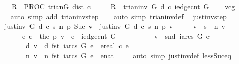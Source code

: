 \begin{isabellebody}
\ \ \ \ {\isasymacute}R\ {\isacharcolon}{\isacharequal}{\isacharequal}\ PROC\ trian{\isacharparenleft}{\isasymacute}G{\isacharcomma}\ {\isasymacute}dist{\isacharcomma}\ {\isasymacute}c{\isacharparenright}\isanewline
\ \ \ \ {\isasymlbrace}\ {\isasymacute}R\ {\isacharequal}\ trian{\isacharunderscore}inv\ G\ d\ c\ {\isacharparenleft}iedge{\isacharunderscore}cnt\ G{\isacharparenright}{\isasymrbrace}{\isachardoublequoteclose}\isanewline
%
\isadelimproof
\ \ %
\endisadelimproof
%
\isatagproof
{}\isamarkupfalse%
\ vcg\ \ \ \isanewline
\ \ \isamarkupfalse%
\ {\isacharparenleft}auto\ simp\ add{\isacharcolon}\ trian{\isacharunderscore}inv{\isacharunderscore}step{\isacharparenright}\isanewline
\ \ \isamarkupfalse%
\ {\isacharparenleft}auto\ simp{\isacharcolon}\ trian{\isacharunderscore}inv{\isacharunderscore}def{\isacharparenright}\ \isanewline
{}\isamarkupfalse%
%
\endisatagproof
{\isafoldproof}%
%
\isadelimproof
\isanewline
%
\endisadelimproof
\isanewline
{}\isamarkupfalse%
\ just{\isacharunderscore}inv{\isacharunderscore}step{\isacharcolon}\isanewline
\ \ {\isachardoublequoteopen}just{\isacharunderscore}inv\ G\ d\ c\ s\ n\ p\ {\isacharparenleft}Suc\ v{\isacharparenright}\ {\isasymlongleftrightarrow}\ just{\isacharunderscore}inv\ G\ d\ c\ s\ n\ p\ v\isanewline
\ \ \ \ {\isasymand}\ {\isacharparenleft}v\ {\isasymnoteq}\ s\ {\isasymand}\ n\ v\ {\isasymnoteq}\ {\isasyminfinity}\ {\isasymlongrightarrow}\ \isanewline
\ \ \ \ \ \ {\isacharparenleft}{\isasymexists}\ e{\isachardot}\ e\ {\isacharequal}\ the\ {\isacharparenleft}p\ v{\isacharparenright}\ {\isasymand}\ e\ {\isacharless}\ iedge{\isacharunderscore}cnt\ G\ {\isasymand}\ \isanewline
\ \ \ \ \ \ \ \ v\ {\isacharequal}\ snd\ {\isacharparenleft}iarcs\ G\ e{\isacharparenright}\ {\isasymand}\isanewline
\ \ \ \ \ \ \ \ d\ v\ {\isacharequal}\ d\ {\isacharparenleft}fst\ {\isacharparenleft}iarcs\ G\ e{\isacharparenright}{\isacharparenright}\ {\isacharplus}\ ereal\ {\isacharparenleft}c\ e{\isacharparenright}\ {\isasymand}\isanewline
\ \ \ \ \ \ \ \ n\ v\ {\isacharequal}\ n\ {\isacharparenleft}fst\ {\isacharparenleft}iarcs\ G\ e{\isacharparenright}{\isacharparenright}\ {\isacharplus}\ {\isacharparenleft}enat\ {}{\isacharparenright}{\isacharparenright}{\isacharparenright}{\isachardoublequoteclose}\isanewline
%
\isadelimproof
\ \ %
\endisadelimproof
%
\isatagproof
{}\isamarkupfalse%
\ {\isacharparenleft}auto\ simp{\isacharcolon}\ just{\isacharunderscore}inv{\isacharunderscore}def\ less{\isacharunderscore}Suc{\isacharunderscore}eq{\isacharparenright}%

\end{isabellebody}
